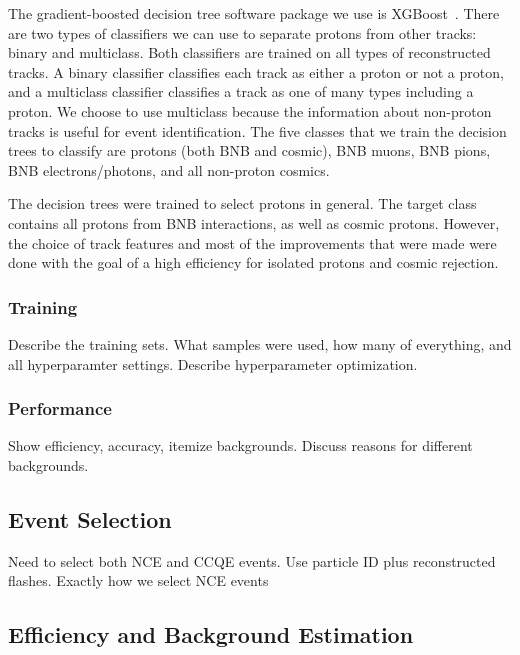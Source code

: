     The gradient-boosted decision tree software package we use is
    XGBoost~\cite{xgboost}. There are two types of classifiers we can use to
    separate protons from other tracks: binary and multiclass. Both classifiers
    are trained on all types of reconstructed tracks. A binary classifier
    classifies each track as either a proton or not a proton, and a multiclass
    classifier classifies a track as one of many types including a proton. We
    choose to use multiclass because the information about non-proton tracks is
    useful for event identification. The five classes that we train the
    decision trees to classify are protons (both BNB and cosmic), BNB muons,
    BNB pions, BNB electrons/photons, and all non-proton cosmics.
    
    The decision trees were trained to select protons in general. The target
    class contains all protons from BNB interactions, as well as cosmic
    protons. However, the choice of track features and most of the improvements
    that were made were done with the goal of a high efficiency for isolated
    protons and cosmic rejection.

  \subsubsection{Training}
    Describe the training sets. What samples were used, how many of everything,
    and all hyperparamter settings. Describe hyperparameter optimization. 
  \subsubsection{Performance}
    Show efficiency, accuracy, itemize backgrounds.
    Discuss reasons for different backgrounds.


\subsection{Event Selection}\label{sec:selection}
  Need to select both NCE and CCQE events.
  Use particle ID plus reconstructed flashes.
  Exactly how we select NCE events 


\subsection{Efficiency and Background Estimation}\label{sec:effbg}
